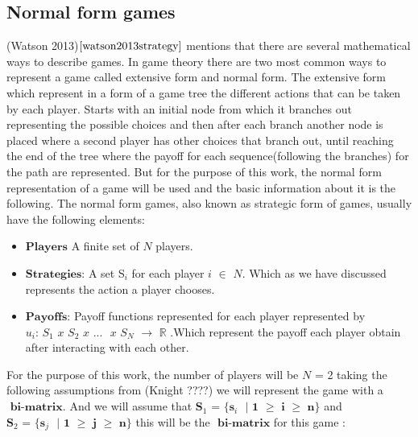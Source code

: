 \documentclass{article}
\begin{document}
\subsection{Normal form games}\label{second_section}
(Watson 2013)$\cite{watson2013strategy}$  mentions that there are several mathematical ways to describe games. In game theory there are two most common ways to represent a game called extensive form and normal form. The extensive form which represent in a form of a game tree the different actions that can be taken by each player. Starts with an initial node from which it branches out representing the possible choices and then after each branch another node is placed where a second player has other choices that branch out, until reaching the end of the tree where the payoff for each sequence(following the branches) for the path are represented. But for the purpose of this work, the normal form representation of a game will be used and the basic information about it is the following.
The normal form games, also known as strategic form of games, usually have the following elements:
\begin{itemize}
\item $\textbf{Players}$ A finite set of $\textit{N}$ players.
\item $\textbf{Strategies:}$ A set S$_i$ for each player $\textit{i}$ $\in$ $\textit{N}$. Which as we have discussed represents the action a player chooses.
\item $\textbf{Payoffs:}$ Payoff functions represented for each player represented by $\textit{u$_i$: S$_1$ x S$_2$ x}$ ... $\textit{ x S$_N$}$ $\rightarrow$ $\mathbb{R}$ .Which represent the payoff each player obtain after interacting with each other.
\end{itemize}

For the purpose of this work, the number of players will be $\textit{N}$ = 2 taking the following assumptions from (Knight ????) we will represent the game with a $\textbf{ bi-matrix}$. And we will assume that  $\textbf{S$_1$ = \{s$_i$ $|$ 1  $\geq$ i $\geq$ n\}}$ and $\textbf{S$_2$ = \{s$_j$ $|$ 1  $\geq$ j $\geq$ n\}}$ this will be the $\textbf{ bi-matrix}$ for this game :
\end{document}

